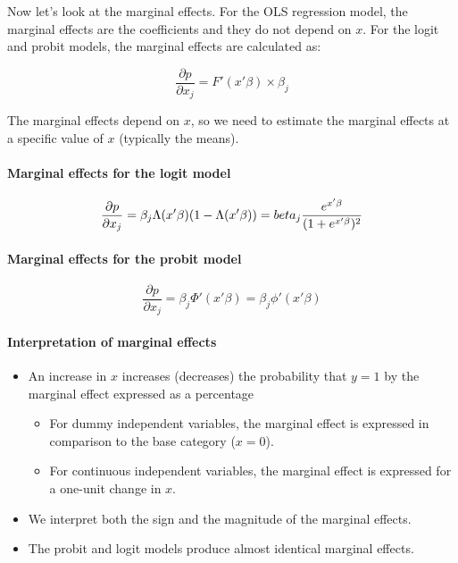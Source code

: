 Now let’s look at the marginal effects. For the OLS regression model, the marginal effects are the
coefficients and they do not depend on $x$. For the logit and probit models, the marginal effects
are calculated as:

\begin{equation}
    \frac{\partial p}{\partial x_j} = F'(x'\beta) \times \beta_j
\end{equation}

The marginal effects depend on $x$, so we need to estimate the marginal effects at a specific value
of $x$ (typically the means).

\paragraph{Marginal effects for the logit model}

\begin{equation}
    \frac{\partial p}{\partial x_j} = \beta_j\Lambda(x'\beta)(1-\Lambda(x'\beta)) =
    \\beta_j\frac{e^{x'\beta}}{(1+e^{x'\beta})^2}
\end{equation}

\paragraph{Marginal effects for the probit model}
\begin{equation}
    \frac{\partial p}{\partial x_j} = \beta_j\Phi'(x'\beta) = \beta_j\phi'(x'\beta)
\end{equation}

\paragraph{Interpretation of marginal effects}
\begin{itemize}
    \item An increase in $x$ increases (decreases) the probability that $y=1$ by the marginal effect
expressed as a percentage
    \begin{itemize}
        \item For dummy independent variables, the marginal effect is expressed in comparison to the
    base category ($x=0$).
        \item For continuous independent variables, the marginal effect is expressed for a one-unit
    change in $x$.
    \end{itemize}
    \item We interpret both the sign and the magnitude of the marginal effects.
    \item The probit and logit models produce almost identical marginal effects.

\end{itemize}


